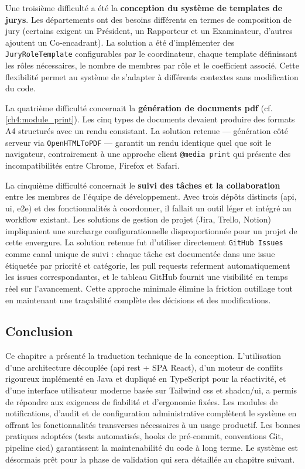 Une troisième difficulté a été la \textbf{conception du système de templates de jurys}. Les départements ont des besoins différents en termes de composition de jury (certains exigent un Président, un Rapporteur et un Examinateur, d'autres ajoutent un Co-encadrant). La solution a été d'implémenter des \texttt{JuryRoleTemplate} configurables par le coordinateur, chaque template définissant les rôles nécessaires, le nombre de membres par rôle et le coefficient associé. Cette flexibilité permet au système de s'adapter à différents contextes sans modification du code.

La quatrième difficulté concernait la \textbf{génération de documents \acrshort{pdf}} (cf. \cref{ch4:module_print}). Les cinq types de documents devaient produire des formats A4 structurés avec un rendu consistant. La solution retenue — génération côté serveur via \texttt{OpenHTMLToPDF} — garantit un rendu identique quel que soit le navigateur, contrairement à une approche client \texttt{@media print} qui présente des incompatibilités entre Chrome, Firefox et Safari.

La cinquième difficulté concernait le \textbf{suivi des tâches et la collaboration} entre les membres de l'équipe de développement. Avec trois dépôts distincts (\acrshort{api}, \acrshort{ui}, \acrshort{e2e}) et des fonctionnalités à coordonner, il fallait un outil léger et intégré au workflow existant. Les solutions de gestion de projet (Jira, Trello, Notion) impliquaient une surcharge configurationnelle disproportionnée pour un projet de cette envergure. La solution retenue fut d'utiliser directement \texttt{GitHub Issues} comme canal unique de suivi : chaque tâche est documentée dans une issue étiquetée par priorité et catégorie, les pull requests referment automatiquement les issues correspondantes, et le tableau GitHub fournit une visibilité en temps réel sur l'avancement. Cette approche minimale élimine la friction outillage tout en maintenant une traçabilité complète des décisions et des modifications.

\subsection{Conclusion}
\label{ch4:conclusion}

Ce chapitre a présenté la traduction technique de la conception. L'utilisation d'une architecture découplée (\acrshort{api} \acrshort{rest} + SPA React), d'un moteur de conflits rigoureux implémenté en Java et dupliqué en TypeScript pour la réactivité, et d'une interface utilisateur moderne basée sur Tailwind \acrshort{css} et shadcn/ui, a permis de répondre aux exigences de fiabilité et d'ergonomie fixées. Les modules de notifications, d'audit et de configuration administrative complètent le système en offrant les fonctionnalités transverses nécessaires à un usage productif. Les bonnes pratiques adoptées (tests automatisés, hooks de pré-commit, conventions Git, pipeline \acrshort{cicd}) garantissent la maintenabilité du code à long terme. Le système est désormais prêt pour la phase de validation qui sera détaillée au chapitre suivant.
